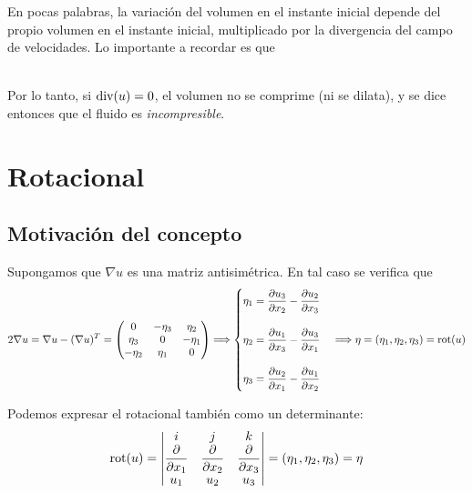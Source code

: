 En pocas palabras, la variación del volumen en el instante inicial depende del propio volumen en el instante inicial, multiplicado por la
divergencia del campo de velocidades. Lo importante a recordar es que \\\\

\vspace{0.5cm}

\noindent Por lo tanto, si $\text{div}(u) = 0$, el volumen no se comprime (ni se dilata), y se dice entonces que el fluido es \textit{incompresible}. 

\section{Rotacional}\label{section:rot}

\subsection{Motivación del concepto}

Supongamos que $\nabla u$ es una matriz antisimétrica. En tal caso se verifica que 
$$2 \nabla u = \nabla u - (\nabla u)^T = \begin{pmatrix}
    0 & - \eta_3 & \eta_2 \\
    \eta_3 & 0 & -\eta_1 \\
    -\eta_2 & \eta_1 & 0
\end{pmatrix} \Longrightarrow \begin{cases}
    \eta_1 = \dfrac{\partial u_3}{\partial x_2} - \dfrac{\partial u_2}{\partial x_3} \\\\
    \eta_2 = \dfrac{\partial u_1}{\partial x_3} - \dfrac{\partial u_3}{\partial x_1} \\\\
    \eta_3 = \dfrac{\partial u_2}{\partial x_1} - \dfrac{\partial u_1}{\partial x_2}
    \end{cases} \Longrightarrow \eta = (\eta_1, \eta_2, \eta_3) = \text{rot}(u)$$

Podemos expresar el rotacional también como un determinante:
$$\text{rot}(u) = \begin{vmatrix}
    i & j & k \\
    \dfrac{\partial}{\partial x_1} & \dfrac{\partial}{\partial x_2} & \dfrac{\partial}{\partial x_3} \\
    u_1 & u_2 & u_3
\end{vmatrix} = (\eta_1, \eta_2, \eta_3) = \eta$$

